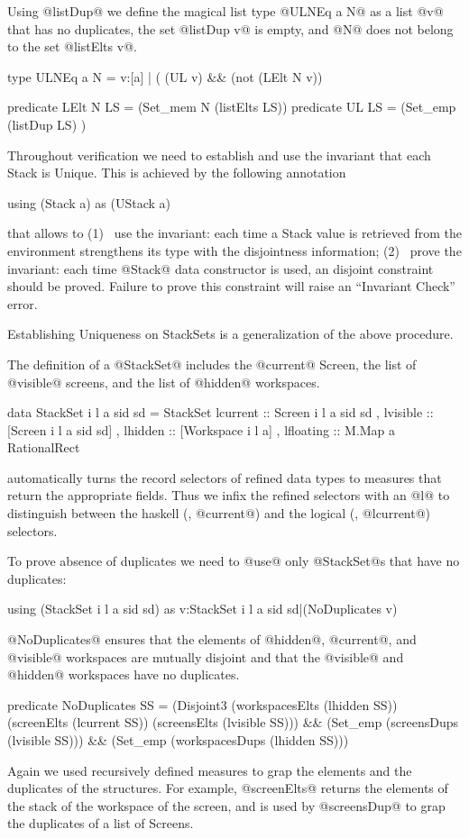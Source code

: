 Using @listDup@ we define the magical list type @ULNEq a N@ 
as a list @v@ that has no duplicates, \ie the set @listDup v@
is empty, and @N@ does not belong to the set @listElts v@.

\begin{code}
type ULNEq a N = {v:[a] | ( (UL v) && (not (LElt N v))}

predicate LElt N LS  = (Set_mem N (listElts LS)) 
predicate UL     LS  = (Set_emp (listDup LS)   )
\end{code}

Throughout verification
we need to establish and use the invariant 
that each Stack is Unique.
%
This is achieved by the following annotation
\begin{code}
using (Stack a) as (UStack a)
\end{code}
that allows \toolname to 
(1)~ use the invariant:
each time a Stack value is retrieved from the environment
\toolname strengthens its type with the disjointness information;
(2)~ prove the invariant:
each time @Stack@ data constructor is used,
an disjoint constraint should be proved.
Failure to prove this constraint will raise an 
``Invariant Check'' error.

Establishing Uniqueness on StackSets is a generalization of the above procedure.

The definition of a @StackSet@ includes 
the @current@ Screen, 
the list of @visible@ screens,
and the list of @hidden@ workspaces.
\begin{code}
data StackSet i l a sid sd = StackSet 
   { lcurrent  ::  Screen i l a sid sd   
   , lvisible  :: [Screen i l a sid sd]
   , lhidden   :: [Workspace i l a]
   , lfloating :: M.Map a RationalRect     
   }
\end{code}
%
\toolname automatically turns the record selectors of refined data types
to measures that return the appropriate fields.
%
Thus we infix the refined selectors with an @l@
to distinguish between the haskell (\eg, @current@)
and the logical (\eg, @lcurrent@) selectors. 

To prove absence of duplicates we need to @use@
only @StackSet@s that have no duplicates:  
\begin{code}
using (StackSet i l a sid sd) 
 as  {v:StackSet i l a sid sd|(NoDuplicates v)}
\end{code}

@NoDuplicates@ ensures that the elements of
@hidden@, @current@, and @visible@ 
workspaces are mutually disjoint
and that the @visible@ and @hidden@ workspaces
have no duplicates.
%
\begin{code}
predicate NoDuplicates SS = 
    (Disjoint3  (workspacesElts (lhidden  SS)) 
                (screenElts     (lcurrent SS)) 
                (screensElts    (lvisible SS))) 
  &&
    (Set_emp (screensDups    (lvisible SS))) 
  &&
    (Set_emp (workspacesDups (lhidden  SS)))
\end{code}
%
Again we used recursively defined measures to grap 
the elements and the duplicates of the structures.
For example, @screenElts@ returns 
the elements of the stack of the workspace of the screen, 
and is used by @screensDup@ to grap the duplicates of 
a list of Screens.

